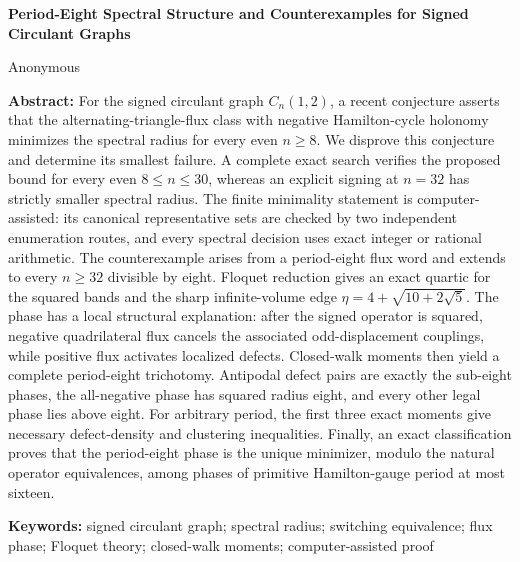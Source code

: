\vspace{14pt}
\begin{center}
{\bfseries Period-Eight Spectral Structure and Counterexamples for Signed Circulant Graphs\par}
\vspace{6pt}
\ifdefined\TargetAAnonymous Anonymous\fi
\end{center}

\noindent\textbf{Abstract:}
For the signed circulant graph \(C_n(1,2)\), a recent conjecture asserts that the
alternating-triangle-flux class with negative Hamilton-cycle holonomy minimizes
the spectral radius for every even \(n\geq 8\). We disprove this conjecture and
determine its smallest failure. A complete exact search verifies the proposed
bound for every even \(8\leq n\leq 30\), whereas an explicit signing at \(n=32\)
has strictly smaller spectral radius. The finite minimality statement is
computer-assisted: its canonical representative sets are checked by two
independent enumeration routes, and every spectral decision uses exact integer
or rational arithmetic. The counterexample arises from a period-eight flux
word and extends to every \(n\geq32\) divisible by eight. Floquet reduction gives
an exact quartic for the squared bands and the sharp infinite-volume edge
\(\eta=4+\sqrt{10+2\sqrt{5}}\). The phase has a local structural explanation:
after the signed operator is squared, negative quadrilateral flux cancels the
associated odd-displacement couplings, while positive flux activates localized
defects. Closed-walk moments then yield a complete period-eight trichotomy.
Antipodal defect pairs are exactly the sub-eight phases, the all-negative phase
has squared radius eight, and every other legal phase lies above eight. For
arbitrary period, the first three exact moments give necessary defect-density
and clustering inequalities. Finally, an exact classification proves that the
period-eight phase is the unique minimizer, modulo the natural operator
equivalences, among phases of primitive Hamilton-gauge period at most sixteen.\par

\noindent\textbf{Keywords:} signed circulant graph; spectral radius; switching
equivalence; flux phase; Floquet theory; closed-walk moments; computer-assisted proof
